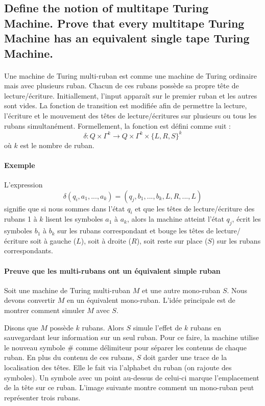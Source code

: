 \subsection{Define the notion of multitape Turing Machine. Prove that every multitape Turing Machine has an equivalent single tape Turing Machine.}
\paragraph{}
Une machine de Turing multi-ruban est comme une machine de Turing ordinaire mais avec plusieurs ruban. Chacun de ces rubans possède sa propre tête de lecture/écriture. Initiallement, l'input apparaît sur le premier ruban et les autres sont vides. La fonction de transition est modifiée afin de permettre la lecture, l'écriture et le mouvement des têtes de lecture/écritures sur plusieurs ou tous les rubans simultanément. Formellement, la fonction est défini comme suit :
\begin{equation}
\delta : Q \times \Gamma^{k} \rightarrow Q \times \Gamma^{k} \times \{L, R, S\}^{k}
\end{equation}
où $k$ est le nombre de ruban.
\paragraph{Exemple} L'expression
\begin{equation}
\delta(q_{i}, a_{1}, ..., a_{k})  = (q_{j} , b_{1}, ..., b_{k}, L, R, ..., L)
\end{equation}
signifie que si nous sommes dans l'état $q_{i}$ et que les têtes de lecture/écriture des rubans 1 à $k$ lisent les symboles $a_{1}$ à $a_{k}$, alors la machine atteint l'état $q_{j}$, écrit les symboles $b_{1}$ à $b_{k}$ sur les rubans correspondant et bouge les têtes de lecture/écriture soit à gauche ($L$), soit à droite ($R$), soit reste sur place ($S$) sur les rubans correspondants.

\paragraph{Preuve que les multi-rubans ont un équivalent simple ruban}
Soit une machine de Turing multi-ruban $M$ et une autre mono-ruban $S$. Nous devons convertir $M$ en un équivalent mono-ruban.
L'idée principale est de montrer comment simuler $M$ avec $S$.

Disons que $M$ possède $k$ rubans. Alors $S$ simule l'effet de $k$ rubans en sauvegardant leur information sur un seul ruban. Pour ce faire, la machine utilise le nouveau symbole $\#$ comme délimiteur pour séparer les contenus de chaque ruban. En plus du contenu de ces rubans, $S$ doit garder une trace de la localisation des têtes. Elle le fait via l'alphabet du ruban (on rajoute des symboles). Un symbole avec un point au-dessus de celui-ci marque l'emplacement de la tête sur ce ruban. L'image suivante montre comment un mono-ruban peut représenter trois rubans.

